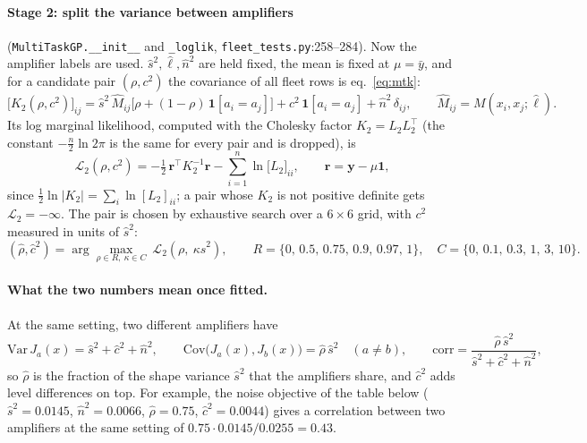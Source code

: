 \documentclass[10pt,a4paper]{article}
\newcommand{\code}[1]{\texttt{\small #1}}
\newcommand{\one}{\mathbf 1}
\begin{document}
\paragraph{Stage 2: split the variance between amplifiers} (\code{MultiTaskGP.\_\_init\_\_} and \code{\_loglik},
\code{fleet\_tests.py}:258--284). Now the amplifier labels are used. $\hat s^2,\hat\ell,\hat n^2$ are held fixed, the mean is fixed at
$\mu=\bar y$, and for a candidate pair $(\rho,c^2)$ the covariance of all fleet rows is eq.~\eqref{eq:mtk}:
\begin{equation}
\big[K_2(\rho,c^2)\big]_{ij}=\hat s^2\,\hat M_{ij}\big[\rho+(1-\rho)\,\one[a_i=a_j]\big]+c^2\,\one[a_i=a_j]+\hat n^2\,\delta_{ij},
\qquad \hat M_{ij}=M(x_i,x_j;\hat\ell).
\end{equation}
Its log marginal likelihood, computed with the Cholesky factor $K_2=L_2L_2^\top$ (the constant $-\frac n2\ln2\pi$ is the same for every
pair and is dropped), is
\begin{equation}
\mathcal L_2(\rho,c^2)=-\tfrac12\,\mathbf r^\top K_2^{-1}\mathbf r-\textstyle\sum_{i=1}^{n}\ln\big[L_2\big]_{ii},
\qquad \mathbf r=\mathbf y-\mu\one ,
\label{eq:stage2}
\end{equation}
since $\tfrac12\ln|K_2|=\sum_i\ln[L_2]_{ii}$; a pair whose $K_2$ is not positive definite gets $\mathcal L_2=-\infty$. The pair is
chosen by exhaustive search over a $6\times6$ grid, with $c^2$ measured in units of $\hat s^2$:
\begin{equation}
(\hat\rho,\hat c^2)=\arg\max_{\rho\in R,\ \kappa\in C}\ \mathcal L_2(\rho,\ \kappa\hat s^2),\qquad
R=\{0,\,0.5,\,0.75,\,0.9,\,0.97,\,1\},\quad C=\{0,\,0.1,\,0.3,\,1,\,3,\,10\}.
\end{equation}

\paragraph{What the two numbers mean once fitted.} At the same setting, two different amplifiers have
\begin{equation}
\mathrm{Var}\,J_a(x)=\hat s^2+\hat c^2+\hat n^2,\qquad
\mathrm{Cov}\big(J_a(x),J_b(x)\big)=\hat\rho\,\hat s^2\quad(a\ne b),\qquad
\mathrm{corr}=\frac{\hat\rho\,\hat s^2}{\hat s^2+\hat c^2+\hat n^2},
\end{equation}
so $\hat\rho$ is the fraction of the shape variance $\hat s^2$ that the amplifiers share, and $\hat c^2$ adds level differences on
top. For example, the noise objective of the table below ($\hat s^2=0.0145$, $\hat n^2=0.0066$, $\hat\rho=0.75$, $\hat c^2=0.0044$) gives a
correlation between two amplifiers at the same setting of $0.75\cdot0.0145/0.0255=0.43$.
\end{document}
